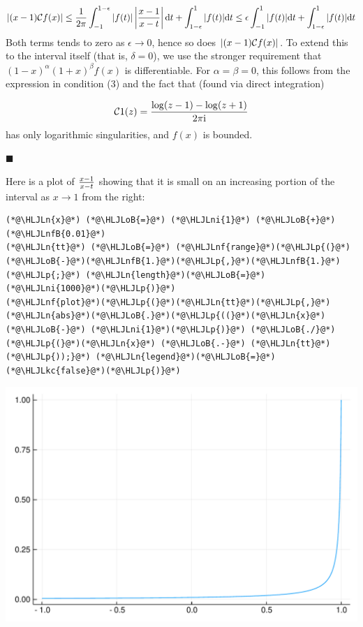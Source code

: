 \documentclass[12pt,a4paper]{article}
\newcommand{\HLJLkc}[1]{\textcolor[RGB]{59,151,46}{\textit{#1}}}
\newcommand{\HLJLn}[1]{#1}
\newcommand{\HLJLnf}[1]{\textcolor[RGB]{66,102,213}{#1}}
\newcommand{\HLJLnfB}[1]{\textcolor[RGB]{59,151,46}{#1}}
\newcommand{\HLJLni}[1]{\textcolor[RGB]{59,151,46}{#1}}
\newcommand{\HLJLoB}[1]{\textcolor[RGB]{102,102,102}{\textbf{#1}}}
\newcommand{\HLJLp}[1]{#1}
\def\D{ {\rm d} }
\def\I{ {\rm i} }
\def\CC{ {\cal C} }
\def\dt{\D t}
\begin{document}
\[
| (x-1) {\cal C} f(x) | \leq {1 \over 2 \pi}\int_{-1}^{1-\epsilon} |f(t) | \left|{x -1 \over x-t }\right| \dt + \int_{1-\epsilon}^1 |f(t) | \dt \leq
\epsilon \int_{-1}^1 |f(t)| \dt + \int_{1-\epsilon}^1 |f(t) | \dt
\]
Both terms tends to zero as $\epsilon \rightarrow 0$, hence so does $| (x-1) {\cal C} f(x) |$.  To extend this to the interval itself (that is, $\delta = 0$), we  use the stronger requirement that $(1-x)^\alpha(1+x)^\beta f(x)$ is differentiable. For $\alpha = \beta = 0$, this follows from the expression in condition (3) and the fact that (found via direct integration)

\[
    \CC 1(z) =  {\log(z-1) - \log(z+1) \over 2 \pi \I}
\]
has only logarithmic singularities, and $f(x)$ is bounded.

\ensuremath{\blacksquare}

Here is a plot of ${x - 1 \over x- t}$ showing that it is small on an increasing portion of the interval as $x \rightarrow 1$ from the right:


\begin{lstlisting}
(*@\HLJLn{x}@*) (*@\HLJLoB{=}@*) (*@\HLJLni{1}@*) (*@\HLJLoB{+}@*) (*@\HLJLnfB{0.01}@*)
(*@\HLJLn{tt}@*) (*@\HLJLoB{=}@*) (*@\HLJLnf{range}@*)(*@\HLJLp{(}@*)(*@\HLJLoB{-}@*)(*@\HLJLnfB{1.}@*)(*@\HLJLp{,}@*)(*@\HLJLnfB{1.}@*)(*@\HLJLp{;}@*) (*@\HLJLn{length}@*)(*@\HLJLoB{=}@*)(*@\HLJLni{1000}@*)(*@\HLJLp{)}@*)
(*@\HLJLnf{plot}@*)(*@\HLJLp{(}@*)(*@\HLJLn{tt}@*)(*@\HLJLp{,}@*) (*@\HLJLn{abs}@*)(*@\HLJLoB{.}@*)(*@\HLJLp{((}@*)(*@\HLJLn{x}@*) (*@\HLJLoB{-}@*) (*@\HLJLni{1}@*)(*@\HLJLp{)}@*) (*@\HLJLoB{./}@*) (*@\HLJLp{(}@*)(*@\HLJLn{x}@*) (*@\HLJLoB{.-}@*) (*@\HLJLn{tt}@*)(*@\HLJLp{));}@*) (*@\HLJLn{legend}@*)(*@\HLJLoB{=}@*)(*@\HLJLkc{false}@*)(*@\HLJLp{)}@*)
\end{lstlisting}

\includegraphics[width=\linewidth]{figures/Lecture12_2_1.pdf}
\end{document}

